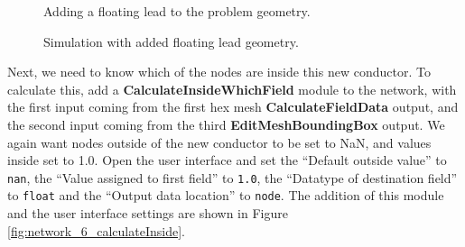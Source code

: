 \documentclass[fleqn,11pt,openany]{book}
\begin{document}
\begin{figure}
\caption{Adding a floating lead to the problem
geometry.}\label{fig:network_6_a_add_blue_blox}
\end{figure}

\begin{figure}
\caption{Simulation with added floating lead
geometry.}\label{fig:step_6_a_results}
\end{figure}

Next, we need to know which of the nodes are inside this new
conductor. To calculate this, add a {\bf CalculateInsideWhichField}
module to the network, with the first input coming from the first hex
mesh {\bf CalculateFieldData} output, and the second input coming from
the third {\bf EditMeshBoundingBox} output. We again want nodes
outside of the new conductor to be set to NaN, and values inside set
to 1.0. Open the user interface and set the ``Default outside value''
to {\tt nan}, the ``Value assigned to first field'' to {\tt 1.0}, the
``Datatype of destination field'' to {\tt float} and the ``Output data
location'' to {\tt node}. The addition of this module and the user
interface settings are shown in Figure
\ref{fig:network_6_calculateInside}.
\end{document}
